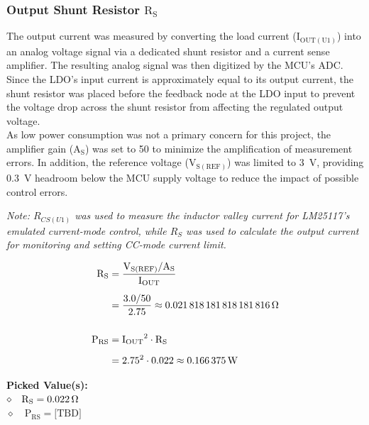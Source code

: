 \documentclass[11pt, a4paper]{article}
\begin{document}
\subsubsection{Output Shunt Resistor \texorpdfstring{$\mathrm{R_S}$}{RS}}
The output current was measured by converting the load current ($\mathrm{I_{OUT(U1)}}$) into an analog voltage signal via a dedicated shunt resistor and a current sense amplifier. The resulting analog signal was then digitized by the MCU's ADC. 
Since the LDO's input current is approximately equal to its output current, the shunt resistor was placed before the feedback node at the LDO input to prevent the voltage drop across the shunt resistor from affecting the regulated output voltage. \\[0.5em]
As low power consumption was not a primary concern for this project, the amplifier gain ($\mathrm{A_S}$) was set to \qty{50}{\times} to minimize the amplification of measurement errors. 
In addition, the reference voltage ($\mathrm{V_{S(REF)}}$) was limited to \qty{3}{\volt}, providing \qty{0.3}{\volt} headroom below the MCU supply voltage to reduce the impact of possible control errors. \\[1em]
{\small\itshape Note: $R_{CS(U1)}$ was used to measure the inductor valley current for LM25117's emulated current-mode control, while $R_S$ was used to calculate the output current for monitoring and setting CC-mode current limit. \par}
\begin{align}
\mathrm{R_S}    &= \frac{\mathrm{V_{S(REF)}} / \mathrm{A_S}}{\mathrm{I_{OUT}}} \nonumber \\[0.5em] 
                &= \frac{3.0 / 50}{2.75} \approx \qty{0.021818181818181816}{\ohm} \\[1.5em]
\mathrm{P_{RS}} &= \mathrm{I_{OUT}}^2 \cdot \mathrm{R_S} \nonumber \\[0.5em]
                &= \num{2.75}^2 \cdot \num{0.022} \approx \qty{0.166375}{\watt}
\end{align}
\begin{pickedbox}
\small\textbf{Picked Value(s):}\\[0.5em]
$\diamond\quad \mathrm{R_S} = \qty{0.022}{\ohm}$ \\[0.25em]
$\diamond\quad \mathrm{P_{RS}} = \text{[TBD]}$  %
\end{pickedbox}
\end{document}
